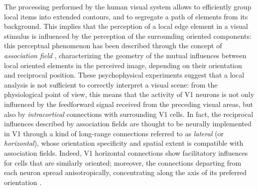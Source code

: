 \documentclass[11pt,oneside,reqno]{amsart}
\begin{document}
 The processing performed by the human visual system allows to efficiently group local items into extended contours, and to segregate a path of elements from its background. This implies that the perception of a local edge element in a visual stimulus is influenced by the perception of the surrounding oriented components: this perceptual phenomenon has been described through the concept of \emph{association field} \citep{field}, characterizing the geometry of the mutual influences between local oriented elements in the perceived image, depending on their orientation and reciprocal position. These psychophysical experiments suggest that a local analysis is not sufficient to correctly interpret a visual scene: from the physiological point of view, this means that the activity of V1 neurons is not only influenced by the feedforward signal received from the preceding visual areas, but also by \emph{intracortical} connections with surrounding V1 cells. In fact, the reciprocal influences described by association fields are thought to be neurally implemented in V1 through a kind of long-range connections referred to as \emph{lateral} (or \emph{horizontal}), whose orientation specificity and spatial extent is compatible with association fields. Indeed, V1 horizontal connections show facilitatory influences for cells that are similarly oriented; moreover, the connections departing from each neuron spread anisotropically, concentrating along the axis of its preferred orientation \cite[see e.g.][]{bosking}.\\
\end{document}

